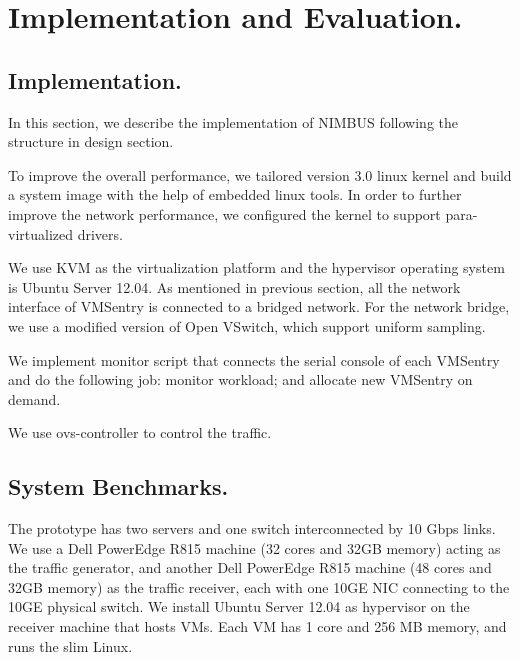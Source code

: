\section{Implementation and Evaluation.}
\subsection{Implementation.}
In this section, we describe the implementation of NIMBUS following the structure in design section.

To improve the overall performance, we tailored version 3.0 linux kernel and build a system image with the help of embedded linux tools. In order to further improve the network performance, we configured the kernel to support para-virtualized drivers.

We use KVM as the virtualization platform and the hypervisor operating system is Ubuntu Server 12.04. As mentioned in previous section, all the network interface of VMSentry is connected to a bridged network. For the network bridge, we use a modified version of Open VSwitch, which support uniform sampling.

We implement monitor script that connects the serial console of each VMSentry and do the following job: monitor workload; and allocate new VMSentry on demand.

We use ovs-controller to control the traffic.

\subsection{System Benchmarks.}
The prototype has two servers and one switch interconnected by 10 Gbps links. We use a Dell PowerEdge R815 machine (32 cores and 32GB memory) acting as the traffic generator, and another Dell PowerEdge R815 machine (48 cores and 32GB memory) as the traffic receiver, each with one 10GE NIC connecting to the 10GE physical switch. We install Ubuntu Server 12.04 as hypervisor on the receiver machine that hosts VMs. Each VM has 1 core and 256 MB memory, and runs the slim Linux.


